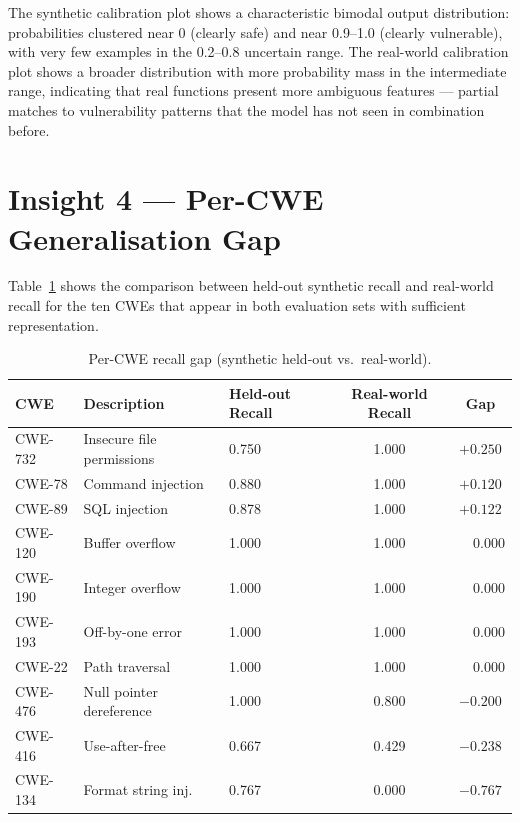 The synthetic calibration plot shows a characteristic bimodal output distribution:
probabilities clustered near 0 (clearly safe) and near 0.9--1.0 (clearly vulnerable),
with very few examples in the 0.2--0.8 uncertain range.
The real-world calibration plot shows a broader distribution with more probability mass
in the intermediate range, indicating that real functions present more ambiguous features ---
partial matches to vulnerability patterns that the model has not seen in combination before.

\section{Insight 4 --- Per-CWE Generalisation Gap}

Table~\ref{tab:gap_cwe} shows the comparison between held-out synthetic recall and
real-world recall for the ten CWEs that appear in both evaluation sets with sufficient
representation.

\begin{table}[H]
  \centering
  \caption{Per-CWE recall gap (synthetic held-out vs.\ real-world).}
  \label{tab:gap_cwe}
  \begin{tabular}{lllcc}
    \toprule
    CWE & Description & Held-out Recall & Real-world Recall & Gap \\
    \midrule
    CWE-732 & Insecure file permissions & 0.750 & 1.000 & $+0.250$ \\
    CWE-78  & Command injection         & 0.880 & 1.000 & $+0.120$ \\
    CWE-89  & SQL injection             & 0.878 & 1.000 & $+0.122$ \\
    CWE-120 & Buffer overflow           & 1.000 & 1.000 & $\phantom{+}0.000$ \\
    CWE-190 & Integer overflow          & 1.000 & 1.000 & $\phantom{+}0.000$ \\
    CWE-193 & Off-by-one error          & 1.000 & 1.000 & $\phantom{+}0.000$ \\
    CWE-22  & Path traversal            & 1.000 & 1.000 & $\phantom{+}0.000$ \\
    CWE-476 & Null pointer dereference  & 1.000 & 0.800 & $-0.200$ \\
    CWE-416 & Use-after-free            & 0.667 & 0.429 & $-0.238$ \\
    CWE-134 & Format string inj.\       & 0.767 & 0.000 & $-0.767$ \\
    \bottomrule
  \end{tabular}
\end{table}

